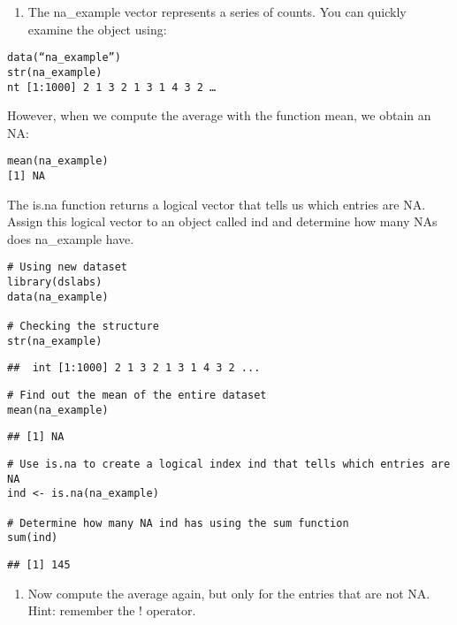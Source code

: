 \documentclass[
]{article}
\providecommand{\tightlist}{%
  \setlength{\itemsep}{0pt}\setlength{\parskip}{0pt}}
\begin{document}
\begin{enumerate}
\def\labelenumi{\arabic{enumi}.}
\setcounter{enumi}{6}
\tightlist
\item
  The na\_example vector represents a series of counts. You can quickly
  examine the object using:
\end{enumerate}

\begin{verbatim}
data(“na_example”)
str(na_example)
nt [1:1000] 2 1 3 2 1 3 1 4 3 2 …
\end{verbatim}

However, when we compute the average with the function mean, we obtain
an NA:

\begin{verbatim}
mean(na_example)
[1] NA
\end{verbatim}

The is.na function returns a logical vector that tells us which entries
are NA. Assign this logical vector to an object called ind and determine
how many NAs does na\_example have.

\begin{verbatim}
# Using new dataset 
library(dslabs)
data(na_example)

# Checking the structure 
str(na_example)
\end{verbatim}

\begin{verbatim}
##  int [1:1000] 2 1 3 2 1 3 1 4 3 2 ...
\end{verbatim}

\begin{verbatim}
# Find out the mean of the entire dataset 
mean(na_example)
\end{verbatim}

\begin{verbatim}
## [1] NA
\end{verbatim}

\begin{verbatim}
# Use is.na to create a logical index ind that tells which entries are NA
ind <- is.na(na_example)

# Determine how many NA ind has using the sum function
sum(ind)
\end{verbatim}

\begin{verbatim}
## [1] 145
\end{verbatim}

\begin{enumerate}
\def\labelenumi{\arabic{enumi}.}
\setcounter{enumi}{7}
\tightlist
\item
  Now compute the average again, but only for the entries that are not
  NA. Hint: remember the ! operator.
\end{enumerate}
\end{document}
